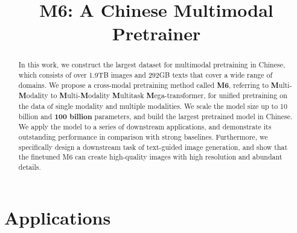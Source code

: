 \title{M6: A Chinese Multimodal Pretrainer}

\begin{abstract}
In this work, we construct the largest dataset for multimodal pretraining in Chinese, which consists of over 1.9TB images and 292GB texts that cover a wide range of domains. We propose a cross-modal pretraining method called \textbf{M6}, referring to \textbf{M}ulti-\textbf{M}odality to \textbf{M}ulti-\textbf{M}odality \textbf{M}ultitask \textbf{M}ega-transformer, for unified pretraining on the data of single modality and multiple modalities. We scale the model size up to 10 billion and \textbf{100 billion} parameters, and build the largest pretrained model in Chinese. We apply the model to a series of downstream applications, and demonstrate its outstanding performance in comparison with strong baselines. Furthermore, we specifically design a downstream task of text-guided image generation, and show that the finetuned M6 can create high-quality images with high resolution and abundant details.
\end{abstract}

\section{Applications} 

\balance


